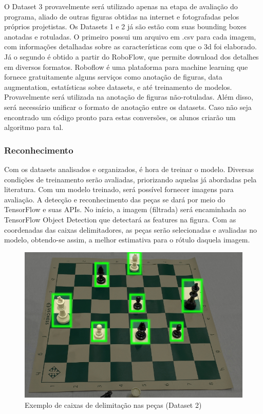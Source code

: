 \documentclass[a4paper,12pt,twoside]{article}
\begin{document}
O Dataset 3 provavelmente será utilizado apenas na etapa de avaliação do programa, aliado de outras figuras obtidas na internet e fotografadas pelos próprios projetistas.
Os Datasets 1 e 2 já são estão com suas bounding boxes anotadas e rotuladas.
O primeiro possui um arquivo em .csv para cada imagem, com informações detalhadas sobre as características com que o 3d foi elaborado. Já o segundo é obtido a partir do RoboFlow, que permite download dos detalhes em diversos formatos.
Roboflow é uma plataforma para machine learning que fornece gratuitamente alguns serviços como anotação de figuras, data augmentation, estatísticas sobre datasets, e até treinamento de modelos.
Provavelmente será utilizada na anotação de figuras não-rotuladas.
Além disso, será necessário unificar o formato de anotação entre os datasets.
Caso não seja encontrado um código pronto para estas conversões, os alunos criarão um algoritmo para tal.

\subsubsection{Reconhecimento}

Com os datasets analisados e organizados, é hora de treinar o modelo.
Diversas condições de treinamento serão avaliadas, priorizando aquelas já abordadas pela literatura.
Com um modelo treinado, será possível fornecer imagens para avaliação.
A detecção e reconhecimento das peças se dará por meio do TensorFlow e suas APIs. No início, a imagem (filtrada) será encaminhada ao TensorFlow Object Detection que detectará as features na figura.
Com as coordenadas das caixas delimitadores, as peças serão selecionadas e avaliadas no modelo, obtendo-se assim, a melhor estimativa para o rótulo daquela imagem.

\begin{figure}[h!]
\centering
  \includegraphics[width=\linewidth]{fig/delimitar.jpg}
  \caption{Exemplo de caixas de delimitação nas peças (Dataset 2)}
\label{fig:delimitar}
\end{figure}
\end{document}
